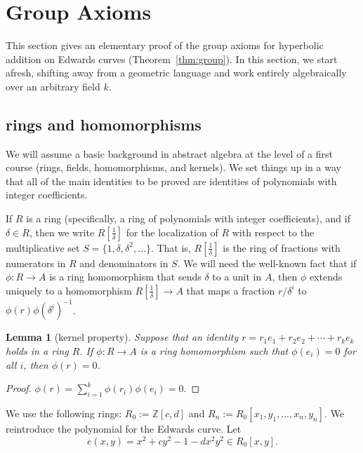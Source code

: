 \documentclass[12pt]{article}
\newtheorem{lemma}[theorem]{Lemma}
\newcommand{\ring}[1]{\mathbb{#1}}
\newcommand{\f}[1]{\frac{1}{#1}}
\begin{document}

\section{Group Axioms}\label{sec:axiom}

This section gives an elementary proof of the group axioms for
hyperbolic addition on Edwards curves (Theorem~\ref{thm:group}).  In
this section, we start afresh, shifting away from a geometric language
and work entirely algebraically over an arbitrary field $k$.

\subsection{rings and homomorphisms}

We will assume a basic background in abstract algebra at the level of
a first course (rings, fields, homomorphisms, and kernels).  We set
things up in a way that all of the main identities to be proved are
identities of polynomials with integer coefficients.

If $R$ is a ring (specifically, a ring of polynomials with integer
coefficients), and if $\delta\in R$, then we write $R[\f{\delta}]$ for
the localization of $R$ with respect to the multiplicative set
$S=\{1,\delta,\delta^2,\ldots\}$.  That is, $R[\f{\delta}]$ is the
ring of fractions with numerators in $R$ and denominators in $S$.  We
will need the well-known fact that if $\phi:R\to A$ is a ring
homomorphism that sends $\delta$ to a unit in $A$, then $\phi$ extends
uniquely to a homomorphism $R[\f{\delta}]\to A$ that maps a fraction
$r/\delta^i$ to $\phi(r)\phi(\delta^i)^{-1}$.

\begin{lemma}[kernel property] Suppose that an identity $r = r_1 e_1 +
  r_2 e_2 +\cdots + r_k e_k$ holds in a ring $R$.  If $\phi:R\to A$ is
  a ring homomorphism such that $\phi(e_i) =0$ for all $i$, then
  $\phi(r)=0$.
\end{lemma}

\begin{proof}
$\phi(r) = \sum_{i=1}^k \phi(r_i) \phi(e_i) = 0.$
\end{proof}

We use the following rings: $R_0 := \ring{Z}[c,d]$ and $R_n :=
R_0[x_1,y_1,\ldots,x_n,y_n]$.  We reintroduce the polynomial for the
Edwards curve.  Let
\begin{equation}
e(x,y) = x^2 + c y^2 -1 - d x^2 y^2 \in  R_0[x,y].
\end{equation}
\end{document}
